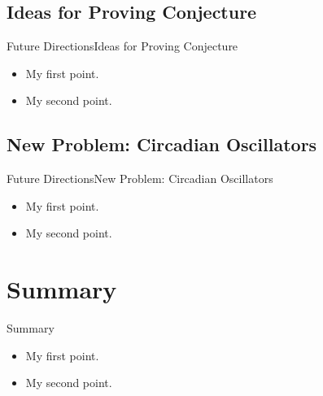 \documentclass{beamer}
\begin{document}
\subsection{Ideas for Proving Conjecture}

\begin{frame}{Future Directions}{Ideas for Proving Conjecture}
	\begin{itemize}
		\item {
			My first point.
		}
		\item {
			My second point.
		}
	\end{itemize}
\end{frame}

\subsection{New Problem: Circadian Oscillators}

\begin{frame}{Future Directions}{New Problem: Circadian Oscillators}
	\begin{itemize}
		\item {
			My first point.
		}
		\item {
			My second point.
		}
	\end{itemize}
\end{frame}

\section*{Summary}
\begin{frame}{Summary}
	\begin{itemize}
		\item {
			My first point.
		}
		\item {
			My second point.
		}
	\end{itemize}
\end{frame}
\end{document}
